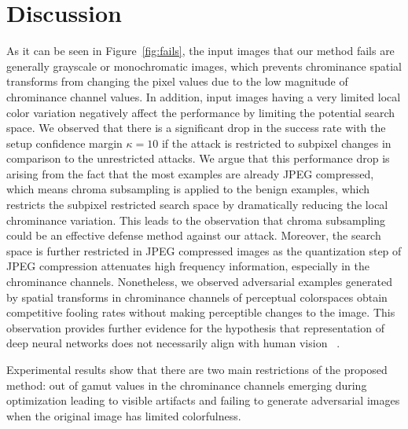 \chapter{Discussion}
\label{chp:5_discussion}


As it can be seen in Figure~\ref{fig:fails}, the input images that our method fails are generally grayscale or monochromatic images, which prevents chrominance spatial transforms from changing the pixel values due to the low magnitude of chrominance channel values. In addition, input images having a very limited local color variation negatively affect the performance by limiting the potential search space. We observed that there is a significant drop in the success rate with the setup confidence margin \(\kappa=10\) if the attack is restricted to subpixel changes in comparison to the unrestricted attacks. We argue that this performance drop is arising from the fact that the most examples are already JPEG compressed, which means chroma subsampling is applied to the benign examples, which restricts the subpixel restricted search space by dramatically reducing the local chrominance variation. This leads to the observation that chroma subsampling could be an effective defense method against our attack. Moreover, the search space is further restricted in JPEG compressed images as the quantization step of JPEG compression attenuates high frequency information, especially in the chrominance channels. Nonetheless, we observed adversarial examples generated by spatial transforms in chrominance channels of perceptual colorspaces obtain competitive fooling rates without making perceptible changes to the image. This observation provides further evidence for the hypothesis that representation of deep neural networks does not necessarily align with human vision ~\cite{geirhos2018imagenet}.

Experimental results show that there are two main restrictions of the proposed method: out of gamut values in the chrominance channels emerging during optimization leading to visible artifacts and failing to generate adversarial images when the original image has limited colorfulness.

